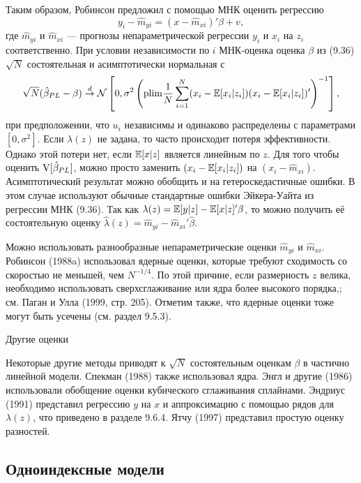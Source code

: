 Таким образом, Робинсон предложил с помощью МНК оценить регрессию
\begin{equation}
y_i - \hat{m}_{yi} = (x - \hat{m}_{xi})'\beta + v,
\end{equation}
где $\hat{m}_{yi}$ и $\hat{m}_{xi}$ --- прогнозы непараметрической регрессии $y_i$ и $x_i$ на $z_i$ соответственно. При условии независимости по $i$ МНК-оценка оценка $\beta$ из (9.36) $\sqrt{N}$ состоятельная и асимптотически нормальная с 
\[
\sqrt{N}(\hat{\beta}_{PL} - \beta) \stackrel{d}{\rightarrow} \mathcal{N} \left[ 0, \sigma^2 \left( \mathrm{plim } \frac{1}{N} \sum_{i=1}^N (x_i - \mathbb{E}[x_i|z_i])(x_i - \mathbb{E}[x_i|z_i])' \right)^{-1} \right],
\]
при предположении, что $u_i$ независимы и одинаково распределены с параметрами $[0,\sigma^2]$. Если $\lambda(z)$ не задана, то часто происходит потеря эффективности. Однако этой потери нет, если $\mathbb{E}[x|z]$ является линейным по $z$. Для того чтобы оценить $\mathrm{V}[\hat{\beta}_{PL}]$, можно просто заменить $(x_i - \mathbb{E}[x_i|z_i])$ на $(x_i - \hat{m}_{xi})$. Асимптотический результат можно обобщить и на гетероскедастичные ошибки. В этом случае используют обычные стандартные ошибки Эйкера-Уайта из регрессии МНК (9.36). Так как $\lambda(z) = \mathbb{E}[y|z] - \mathbb{E}[x|z]'\beta$, то можно получить её состоятельную оценку $\hat{\lambda}(z) = \hat{m}_{yi} - \hat{m}_{xi}'\hat{\beta}$.

Можно использовать разнообразные непараметрические оценки $\hat{m}_{yi}$ и $\hat{m}_{xi}$. Робинсон (1988a) использовал ядерные оценки, которые требуют сходимость со скоростью не меньшей, чем $N^{-1/4}$. По этой причине, если размерность $z$ велика, необходимо использовать сверхсглаживание или ядра более высокого порядка,; см. Паган и Улла (1999, стр. 205). Отметим также, что ядерные оценки тоже могут быть усечены (см. раздел 9.5.3).

\begin{center}
Другие оценки
\end{center}

Некоторые другие методы приводят к $\sqrt{N}$ состоятельным оценкам $\beta$ в частично линейной модели. Спекман (1988) также использовал ядра. Энгл и другие (1986) использовали обобщение оценки кубического сглаживания сплайнами. Эндриус (1991) представил регрессию $y$ на $x$ и аппроксимацию с помощью рядов для $\lambda(z)$, что приведено в разделе 9.6.4. Ятчу (1997) представил простую оценку разностей.

\subsection{Одноиндексные модели}


